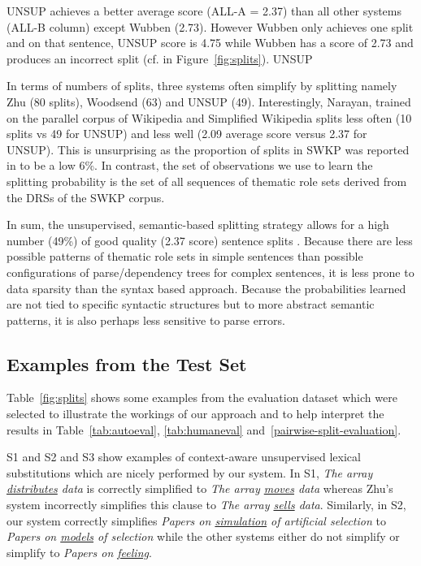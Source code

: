 \documentclass[11pt,a4paper]{article}
\newcommand{\nlang}[1]{{\it #1}}
\begin{document}
UNSUP achieves a better average score (ALL-A = 2.37) than all other
systems (ALL-B column) except Wubben (2.73). However Wubben only
achieves one split and on that sentence, UNSUP score is 4.75 while
Wubben has a score of 2.73 and produces an incorrect split (cf. 
in Figure~\ref{fig:splits}). UNSUP

In terms of numbers of splits, three systems often simplify by
splitting namely Zhu (80 splits), Woodsend (63) and UNSUP (49).
Interestingly, Narayan, trained on the parallel corpus of Wikipedia
and Simplified Wikipedia splits less often (10 splits vs 49 for UNSUP)
and less well (2.09 average score versus 2.37 for UNSUP). This is
unsurprising as the proportion of splits in SWKP was reported in
\cite{narayan2014hybrid} to be a low 6\%. In contrast, the set of
observations we use to learn the splitting probability is the set of
all sequences of thematic role sets derived from the DRSs of the SWKP
corpus.

In sum, the unsupervised, semantic-based splitting strategy allows for
a high number (49\%) of good quality (2.37 score) sentence splits .
Because there are less possible patterns of thematic role sets in
simple sentences than possible configurations of parse/dependency
trees for complex sentences, it is less prone to data sparsity than
the syntax based approach. Because the probabilities learned are not
tied to specific syntactic structures but to more abstract semantic
patterns, it is also perhaps less sensitive to parse errors.

\subsection{Examples from the Test Set}

Table~\ref{fig:splits} shows some examples from the evaluation
dataset which were selected to illustrate the workings of our approach
and to help interpret the results in
Table~\ref{tab:autoeval}, \ref{tab:humaneval}
and~\ref{pairwise-split-evaluation}.

S1 and S2 and S3 show examples of context-aware unsupervised lexical
substitutions which are nicely performed by our system. In S1,
\nlang{The array \underline{distributes} data} is correctly simplified
to \nlang{The array \underline{moves} data} whereas
Zhu's system incorrectly simplifies this clause to \nlang{The array
  \underline{sells} data}. Similarly, in S2, our system correctly simplifies
\nlang{Papers on \underline{simulation} of artificial selection} to
\nlang{Papers on \underline{models} of selection} while the other
systems either do not simplify or simplify to \nlang{Papers on
  \underline{feeling}}.
\end{document}
